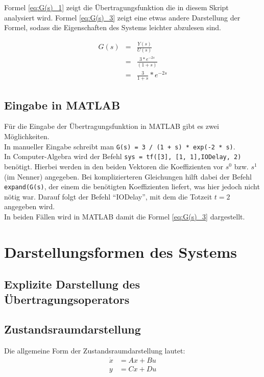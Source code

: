 Formel \ref{eq:G(s)_1} zeigt die Übertragungsfunktion die in diesem Skript analysiert wird. Formel \ref{eq:G(s)_3} zeigt eine etwas andere Darstellung der Formel, sodass die Eigenschaften des Systems leichter abzulesen sind.

\begin{eqnarray}
    \label{eq:G(s)_1}
    G(s) &=& \frac{Y(s)}{U(s)} \\
    \label{eq:G(s)_2}
    &=& \frac{3 * e^{-2s}}{(1+s)} \\
    \label{eq:G(s)_3}
    &=& \frac{3}{1 + s} * e^{-2s}
\end{eqnarray}

\subsection{Eingabe in MATLAB}
Für die Eingabe der Übertragungsfunktion in MATLAB gibt es zwei Möglichkeiten. \\
In manueller Eingabe schreibt man \texttt{G(s) =  3 / (1 + s) * exp(-2 * s)}. \\
In Computer-Algebra wird der Befehl \texttt{sys = tf([3], [1, 1],\textquotedbl IODelay\textquotedbl, 2)} benötigt. Hierbei werden in den beiden Vektoren die Koeffizienten vor $s^0$ bzw. $s^1$ (im Nenner) angegeben. Bei komplizierteren Gleichungen hilft dabei der Befehl \texttt{expand(G(s)}, der einem die benötigten Koeffizienten liefert, was hier jedoch nicht nötig war. Darauf folgt der Befehl \enquote{IODelay}, mit dem die Totzeit $t = 2$ angegeben wird.\\
In beiden Fällen wird in MATLAB damit die Formel \ref{eq:G(s)_3} dargestellt.

\section{Darstellungsformen des Systems}

\subsection{Explizite Darstellung des Übertragungsoperators}

\subsection{Zustandsraumdarstellung}
Die allgemeine Form der Zustandsraumdarstellung lautet:
\begin{align*}
    \dot x & = Ax + Bu \nonumber \\
    y & = Cx + Du
\end{align*}

